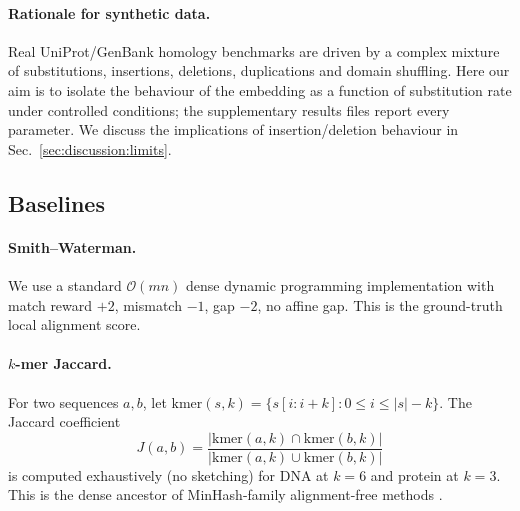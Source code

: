 \documentclass[twocolumn,11pt,a4paper]{article}
\theoremstyle{definition}
\theoremstyle{remark}
\newcommand{\bigO}{\mathcal{O}}
\begin{document}
\paragraph{Rationale for synthetic data.} Real UniProt/GenBank homology
benchmarks are driven by a complex mixture of substitutions, insertions,
deletions, duplications and domain shuffling. Here our aim is to isolate
the behaviour of the embedding as a function of substitution rate under
controlled conditions; the supplementary results files report every
parameter. We discuss the implications of insertion/deletion behaviour in
Sec.~\ref{sec:discussion:limits}.

\subsection{Baselines}

\paragraph{Smith--Waterman.} We use a standard $\bigO(mn)$ dense dynamic
programming implementation with match reward $+2$, mismatch $-1$, gap $-2$,
no affine gap. This is the ground-truth local alignment score.

\paragraph{$k$-mer Jaccard.} For two sequences $a, b$, let
$\mathrm{kmer}(s, k) = \{s[i:i+k] : 0 \le i \le |s| - k\}$. The Jaccard
coefficient
\begin{equation}
    J(a, b) = \frac{|\mathrm{kmer}(a, k) \cap \mathrm{kmer}(b, k)|}
                    {|\mathrm{kmer}(a, k) \cup \mathrm{kmer}(b, k)|}
\end{equation}
is computed exhaustively (no sketching) for DNA at $k = 6$ and protein at
$k = 3$. This is the dense ancestor of MinHash-family alignment-free
methods \citep{broder1997,ondov2016}.
\end{document}
